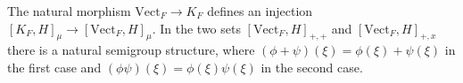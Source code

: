 The natural morphism $\text{Vect}_F \rightarrow K_F$ defines an injection $[K_F, H]_\mu \rightarrow [\text{Vect}_F, H]_\mu$. In the two sets $[\text{Vect}_F, H]_{+,+}$ and $[\text{Vect}_F, H]_{+,x}$ there is a natural semigroup structure, where $(\phi + \psi)(\xi) = \phi(\xi) + \psi(\xi)$ in the first case and $(\phi\psi)(\xi) = \phi(\xi)\psi(\xi)$ in the second case.
